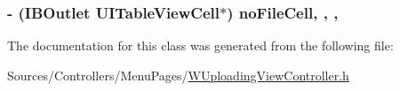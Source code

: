 \hypertarget{interface_w_uploading_view_controller_a6a3ce2d6d03b1ee89f39e5bc0972c76c}{
\subsubsection[{no\-File\-Cell}]{\setlength{\rightskip}{0pt plus 5cm}-\/ (I\-B\-Outlet U\-I\-Table\-View\-Cell$\ast$) no\-File\-Cell\hspace{0.3cm}{\ttfamily [read]}, {\ttfamily [write]}, {\ttfamily [nonatomic]}, {\ttfamily [retain]}}}\label{interface_w_uploading_view_controller_a6a3ce2d6d03b1ee89f39e5bc0972c76c}


The documentation for this class was generated from the following file\-:\begin{DoxyCompactItemize}
\item 
Sources/\-Controllers/\-Menu\-Pages/\hyperlink{_w_uploading_view_controller_8h}{W\-Uploading\-View\-Controller.\-h}\end{DoxyCompactItemize}

